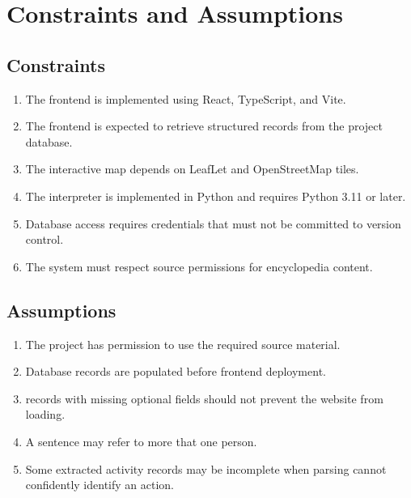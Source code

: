 \section{Constraints and Assumptions}

\subsection{Constraints}

\begin{enumerate}
	\item The frontend is implemented using React, TypeScript, and Vite.
	\item The frontend is expected to retrieve structured records from the project database.
	\item The interactive map depends on LeafLet and OpenStreetMap tiles.
	\item The interpreter is implemented in Python and requires Python 3.11 or later.
	\item Database access requires credentials that must not be committed to version control.
	\item The system must respect source permissions for encyclopedia content.
\end{enumerate}

\subsection{Assumptions}

\begin{enumerate}
	\item The project has permission to use the required source material.
	\item Database records are populated before frontend deployment.
	\item records with missing optional fields should not prevent the website from loading.
	\item A sentence may refer to more that one person.
	\item Some extracted activity records may be incomplete when parsing cannot confidently identify an action.
\end{enumerate}
